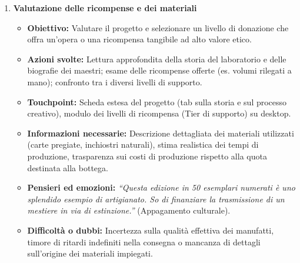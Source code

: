 \documentclass[11pt,a4paper]{article}
\begin{document}
\begin{enumerate}
        \item \textbf{Valutazione delle ricompense e dei materiali}
        \begin{itemize}
            \item \textbf{Obiettivo:} Valutare il progetto e selezionare un livello di donazione che offra un'opera o una ricompensa tangibile ad alto valore etico.
            \item \textbf{Azioni svolte:} Lettura approfondita della storia del laboratorio e delle biografie dei maestri; esame delle ricompense offerte (es. volumi rilegati a mano); confronto tra i diversi livelli di supporto.
            \item \textbf{Touchpoint:} Scheda estesa del progetto (tab sulla storia e sul processo creativo), modulo dei livelli di ricompensa (Tier di supporto) su desktop.
            \item \textbf{Informazioni necessarie:} Descrizione dettagliata dei materiali utilizzati (carte pregiate, inchiostri naturali), stima realistica dei tempi di produzione, trasparenza sui costi di produzione rispetto alla quota destinata alla bottega.
            \item \textbf{Pensieri ed emozioni:} \textit{``Questa edizione in 50 esemplari numerati è uno splendido esempio di artigianato. So di finanziare la trasmissione di un mestiere in via di estinzione.''} (Appagamento culturale).
            \item \textbf{Difficoltà o dubbi:} Incertezza sulla qualità effettiva dei manufatti, timore di ritardi indefiniti nella consegna o mancanza di dettagli sull'origine dei materiali impiegati.
        \end{itemize}


\end{enumerate}
\end{document}
